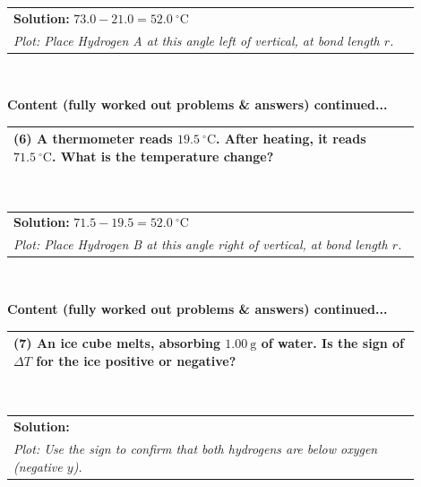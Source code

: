 \documentclass{article}
\begin{document}
{{{{{{\begin{tabular}{|p{0.9\linewidth}|}
\hline
\textbf{Solution:} $73.0 - 21.0 = 52.0~^\circ\text{C}$ \\
\textit{Plot: Place Hydrogen A at this angle left of vertical, at bond length $r$.} \\
\hline
\end{tabular}
\\
\newpage
\noindent
{\large \textbf{Content (fully worked out problems \& answers) continued...}
\\
\begin{tabular}{|p{0.9\linewidth}|}
\hline
\textbf{(6)} A thermometer reads $19.5~^\circ\text{C}$. After heating, it reads $71.5~^\circ\text{C}$.  
What is the temperature change? 
\\ \hline
\end{tabular}
\\
\begin{tabular}{|p{0.9\linewidth}|}
\hline
\textbf{Solution:} $71.5 - 19.5 = 52.0~^\circ\text{C}$ \\
\textit{Plot: Place Hydrogen B at this angle right of vertical, at bond length $r$.} \\
\hline
\end{tabular}
\\
\newpage
\noindent
{\large \textbf{Content (fully worked out problems \& answers) continued...}
\\
\begin{tabular}{|p{0.9\linewidth}|}
\hline
\textbf{(7)} An ice cube melts, absorbing $1.00~\text{g}$ of water. Is the sign of $\Delta T$ for the ice positive or negative? 
\\ \hline
\end{tabular}
\\
\begin{tabular}{|p{0.9\linewidth}|}
\hline
\textbf{Solution:} \\
\textit{Plot: Use the sign to confirm that both hydrogens are below oxygen (negative $y$).} \\

\end{tabular}}}}}}}}}
\end{document}
